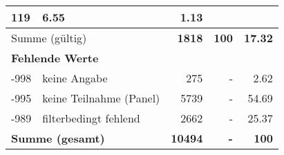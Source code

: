 \begin{longtable}{lXrrr}
       \num{119} &
       \num[round-mode=places,round-precision=2]{6.55} &
         \num[round-mode=places,round-precision=2]{1.13} \\
     \midrule
     \multicolumn{2}{l}{Summe (gültig)} &
       \textbf{\num{1818}} &
     \textbf{\num{100}} &
       \textbf{\num[round-mode=places,round-precision=2]{17.32}} \\
     \multicolumn{5}{l}{\textbf{Fehlende Werte}}\\
       -998 &
       keine Angabe &
         \num{275} &
        - &
         \num[round-mode=places,round-precision=2]{2.62} \\
       -995 &
       keine Teilnahme (Panel) &
         \num{5739} &
        - &
         \num[round-mode=places,round-precision=2]{54.69} \\
       -989 &
       filterbedingt fehlend &
         \num{2662} &
        - &
         \num[round-mode=places,round-precision=2]{25.37} \\
     \midrule
     \multicolumn{2}{l}{\textbf{Summe (gesamt)}} &
          \textbf{\num{10494}} &
        \textbf{-} &
        \textbf{\num{100}} \\
     \bottomrule
     \end{longtable}
     
